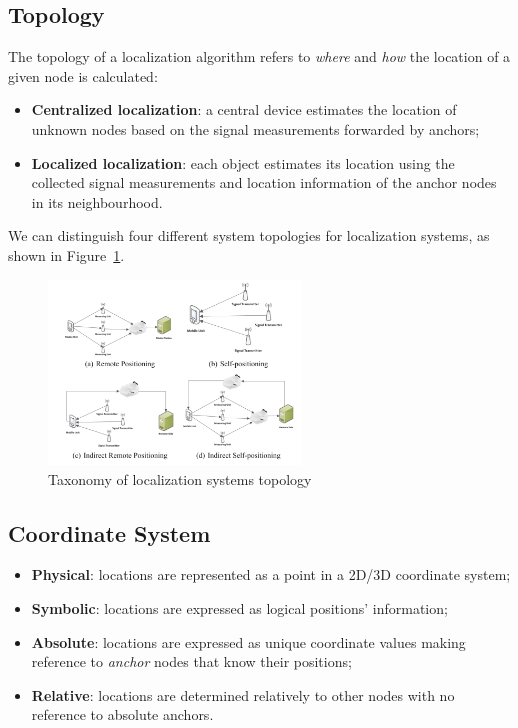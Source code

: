\documentclass[a4paper,12pt]{article}
\begin{document}
\subsection{Topology}
The topology of a localization algorithm refers to \textit{where} and \textit{how} the location of a given node is calculated:

\begin{itemize}
	\item \textbf{Centralized localization}: a central device estimates the location of unknown nodes based on the signal measurements forwarded by anchors;
	\item \textbf{Localized localization}: each object estimates its location using the collected signal measurements and location information of the anchor nodes in its neighbourhood.
\end{itemize}

We can distinguish four different system topologies for localization systems, as shown in Figure~\ref{fig:topology}.
\begin{figure}
	\centering
  \includegraphics[width=0.6\textwidth]{img/topology}
  \caption{\label{fig:topology}Taxonomy of localization systems topology}
\end{figure}

\subsection{Coordinate System}
\begin{itemize}
  \item \textbf{Physical}: locations are represented as a point in a 2D/3D coordinate system;
  \item \textbf{Symbolic}: locations are expressed as logical positions’ information;
  \item \textbf{Absolute}: locations are expressed as unique coordinate values making reference to \textit{anchor} nodes that know their positions;
  \item \textbf{Relative}: locations are determined relatively to other nodes with no reference to absolute anchors.
\end{itemize}
\end{document}
